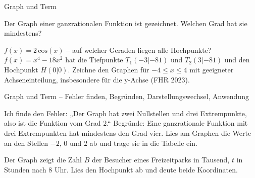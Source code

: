 \begin{aufgabe}{Graph und Term}
\begin{teile}
\begin{ksys}[xmin=-1,xmax=5,ymin=-2,ymax=5,ablesen]\end{ksys}
\teil Der Graph einer ganzrationalen Funktion ist gezeichnet. Welchen Grad hat sie mindestens?

\begin{ksys}[xmin=-4,xmax=4,ymin=-4,ymax=3]\end{ksys}
\teil $f(x) = 2\,\mathrm{cos}(x)$ – auf welcher Geraden liegen alle Hochpunkte?
\teil $f(x) = x^4 - 18x^2$ hat die Tiefpunkte $T_1(-3 | -81)$ und $T_2(3 | -81)$ und den Hochpunkt $H(0 | 0)$. Zeichne den Graphen für $-4 \le x \le 4$ mit geeigneter Achseneinteilung, insbesondere für die y-Achse \hfill (FHR 2023).

\end{teile}
\end{aufgabe}

\begin{aufgabe}{Graph und Term – Fehler finden, Begründen, Darstellungswechsel, Anwendung}
\begin{teile}
\teil Ich finde den Fehler: „Der Graph hat zwei Nullstellen und drei Extrempunkte, also ist die Funktion vom Grad $2$.“
\teil Begründe: Eine ganzrationale Funktion mit drei Extrempunkten hat mindestens den Grad vier.
\teil Lies am Graphen die Werte an den Stellen $-2$, $0$ und $2$ ab und trage sie in die Tabelle ein.

\begin{ksys}[xmin=-3,xmax=3,ymin=-2,ymax=3,ablesen]\end{ksys}
\teil Der Graph zeigt die Zahl $B$ der Besucher eines Freizeitparks in Tausend, $t$ in Stunden nach 8 Uhr. Lies den Hochpunkt ab und deute beide Koordinaten.

\begin{ksys}[xmin=0,xmax=12,ymin=0,ymax=10,xstep=1,ystep=1,xlabel=t in h,ylabel=B in Tausend,ablesen]\end{ksys}
\end{teile}
\end{aufgabe}
